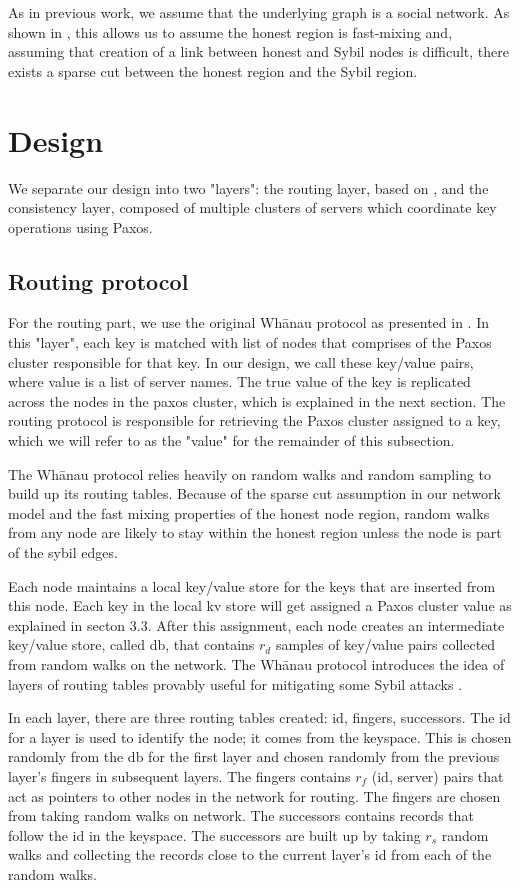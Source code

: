 \documentclass[letter]{article}
\begin{document}
As in previous work, we assume that the underlying graph is a social network.
As shown in \cite{whanau}, this allows us to assume the honest region is
fast-mixing and, assuming that creation of a link between honest and Sybil
nodes is difficult, there exists a sparse cut between the honest region
and the Sybil region.


\section{Design}

We separate our design into two "layers": the routing layer, based on
\cite{whanau}, and the consistency layer, composed of multiple clusters of
servers which coordinate key operations using Paxos.

\subsection{Routing protocol}
For the routing part, we use the original Wh\={a}nau protocol as presented in \cite{whanau}. In this "layer", each key is matched with list of nodes that comprises of the Paxos cluster responsible for that key. In our design, we call these key/value pairs, where value is a list of server names. The true value of the key is replicated across the nodes in the paxos cluster, which is explained in the next section. The routing protocol is responsible for retrieving the Paxos cluster assigned to a key, which we will refer to as the "value" for the remainder of this subsection.

The Wh\={a}nau protocol relies heavily on random walks and random sampling to build up its routing tables.
Because of the sparse cut assumption in our network model
and the fast mixing properties of the honest node region,
random walks from any node are likely to stay within the honest region
unless the node is part of the sybil edges.

Each node maintains a local key/value store for the keys that are inserted from this node. Each key in the local kv store will get assigned a Paxos cluster value as explained in secton 3.3.
After this assignment, each node creates an intermediate key/value store, called db, that contains $r_d$ samples of key/value pairs collected from random walks on the network.
The Wh\={a}nau protocol introduces the idea of layers of routing tables provably useful for mitigating some Sybil attacks \cite{whanau}.

In each layer, there are three routing tables created: id, fingers, successors.
The id for a layer is used to identify the node; it comes from the keyspace. This is chosen randomly from the db for the first layer and chosen randomly from the previous layer's fingers in subsequent layers.
The fingers contains $r_{f}$ (id, server) pairs that act as pointers to other nodes in the network for routing. The fingers are chosen from taking random walks on network.
The successors contains records that follow the id in the keyspace. The successors are built up by taking $r_{s}$ random walks and collecting the records close to the current layer's id from each of the random walks.
\end{document}
